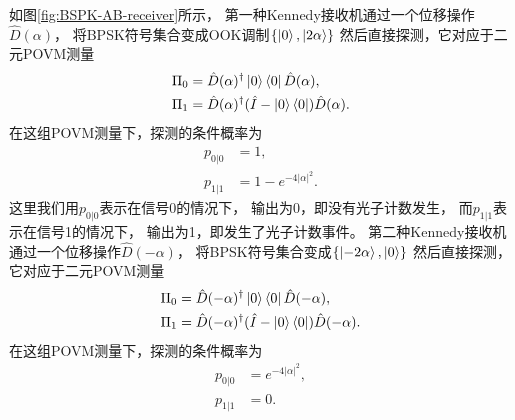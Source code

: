 如图\ref{fig:BSPK-AB-receiver}所示，
第一种Kennedy接收机通过一个位移操作$\hat{D}(\alpha)$，
将BPSK符号集合变成OOK调制$\{\ket{0}, \ket{2\alpha}\}$
然后直接探测，它对应于二元POVM测量
\begin{equation}
\begin{split}
\Pi_0 &= \hat{D}(\alpha)^\dagger \ket{0}\bra{0} \hat{D}(\alpha) ,\\
\Pi_1 &= \hat{D}(\alpha)^\dagger (\hat{I} - \ket{0}\bra{0}) \hat{D}(\alpha) .
\end{split}
\end{equation}
在这组POVM测量下，探测的条件概率为
\begin{equation}
\begin{split}
p_{0|0} &= 1, \\
p_{1|1} &= 1 - e^{-4|\alpha|^2}.
\end{split}
\end{equation}
这里我们用$p_{0|0}$表示在信号0的情况下，
输出为0，即没有光子计数发生，
而$p_{1|1}$表示在信号1的情况下，
输出为1，即发生了光子计数事件。
第二种Kennedy接收机通过一个位移操作$\hat{D}(-\alpha)$，
将BPSK符号集合变成$\{ \ket{-2\alpha}, \ket{0}\}$
然后直接探测，它对应于二元POVM测量
\begin{equation}
\begin{split}
\Pi_0 &= \hat{D}(-\alpha)^\dagger \ket{0}\bra{0} \hat{D}(-\alpha) ,\\
\Pi_1 &= \hat{D}(-\alpha)^\dagger (\hat{I} - \ket{0}\bra{0}) \hat{D}(-\alpha) .
\end{split}
\end{equation}
在这组POVM测量下，探测的条件概率为
\begin{equation}
\begin{split}
p_{0|0} &= e^{-4|\alpha|^2}, \\
p_{1|1} &= 0.
\end{split}
\end{equation}


